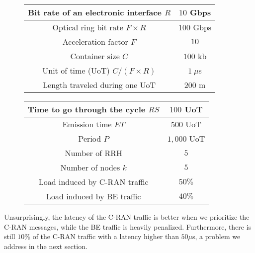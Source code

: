 \begin{figure}[h]
\begin{minipage}[c]{.49\linewidth}
\begin{center}
  \scalebox{.7}
  {
  \begin{tabular}{|c|c|}
  \hline
  Bit rate of an electronic interface $R$ & $10$ Gbps \tabularnewline
  \hline
  Optical ring bit rate $F\times R$ & $100$ Gbps \tabularnewline
  \hline
    Acceleration factor $F$ & $10$  \tabularnewline
  \hline
  Container size  $C$ & $100$ kb  \tabularnewline
  \hline
  Unit of time (UoT) $C/(F\times R)$ & $1~\mu$s \tabularnewline
  \hline
  Length traveled during one UoT & $200$ m \tabularnewline
  \hline
    \end{tabular}
  }
\end{center}
\end{minipage} %
\begin{minipage}[c]{.49\linewidth}
\begin{center}
   \scalebox{.7}
  {
  \begin{tabular}{|c|c|}
  \hline
  Time to go through the cycle $RS$ & $100$ UoT \tabularnewline
  \hline
  Emission time $ET$ & $500$ UoT \tabularnewline
  \hline
   Period $P$ & $1,000$ UoT \tabularnewline
  \hline
  Number of RRH & $5$  \tabularnewline
  \hline
  Number of nodes $k$ & $5$  \tabularnewline
  \hline
   Load induced by C-RAN traffic & $50\%$  \tabularnewline
  \hline
    Load induced by BE traffic & $40\%$  \tabularnewline
  \hline
  \end{tabular}
}
\end{center}
\end{minipage}
  \label{fig:params}
\end{figure}



Unsurprisingly, the latency of the C-RAN traffic is better when we prioritize the C-RAN messages, while the BE traffic is heavily penalized. Furthermore, there is still $10\%$ of the C-RAN traffic with a latency higher than $50 \mu$s, a problem we address in the next section.



